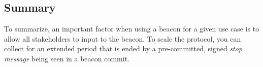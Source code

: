 \subsection{Summary}
To summarize, an important factor when using a beacon for a given use case is to allow all stakeholders to input to the beacon.
To scale the protocol, you can collect for an extended period that is ended by a pre-committed, signed \textit{stop message} being seen in a beacon commit.

